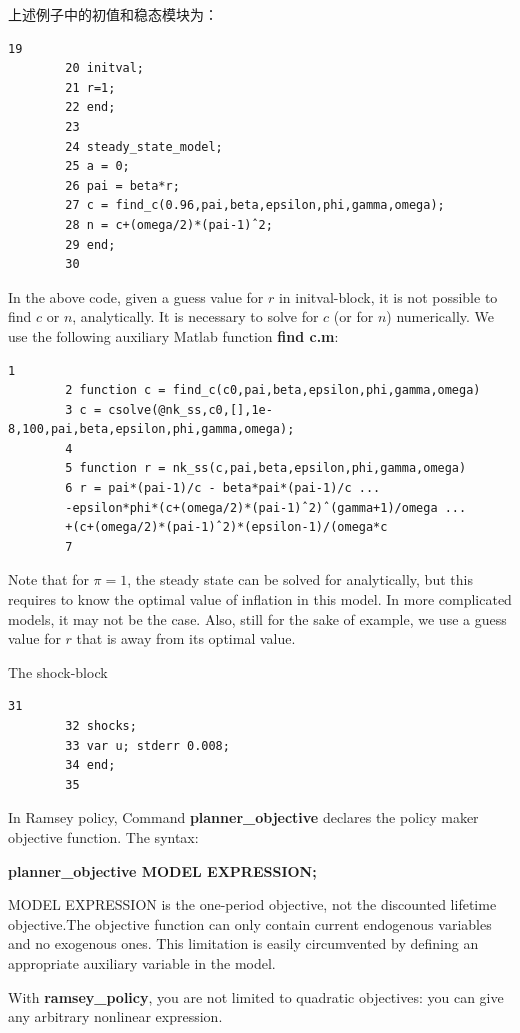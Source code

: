 \documentclass[10pt,math=newtx,citestyle=gb7714-2015,bibstyle=gb7714-2015]{elegantbook}
\begin{document}
{	上述例子中的初值和稳态模块为：
	
	\begin{lstlisting}[frame=shadowbox]
		19
		20 initval;
		21 r=1;
		22 end;
		23 
		24 steady_state_model;
		25 a = 0;
		26 pai = beta*r;
		27 c = find_c(0.96,pai,beta,epsilon,phi,gamma,omega);
		28 n = c+(omega/2)*(pai-1)ˆ2;
		29 end;
		30
	\end{lstlisting}
	
	In the above code, given a guess value for $r$ in initval-block, it is not possible to find $c$ or $n$, analytically. It is necessary to solve for $c$ (or for $n$) numerically. We use the following auxiliary Matlab function \textbf{find c.m}:
	
	\begin{lstlisting}[frame=shadowbox]
		1
		2 function c = find_c(c0,pai,beta,epsilon,phi,gamma,omega)
		3 c = csolve(@nk_ss,c0,[],1e-8,100,pai,beta,epsilon,phi,gamma,omega);
		4 
		5 function r = nk_ss(c,pai,beta,epsilon,phi,gamma,omega)
		6 r = pai*(pai-1)/c - beta*pai*(pai-1)/c ...
		-epsilon*phi*(c+(omega/2)*(pai-1)ˆ2)ˆ(gamma+1)/omega ...
		+(c+(omega/2)*(pai-1)ˆ2)*(epsilon-1)/(omega*c
		7
	\end{lstlisting}
	
	Note that for $\pi = 1$, the steady state can be solved for analytically, but this requires to know the optimal value of inflation in this model. In more complicated models, it
	may not be the case. Also, still for the sake of example, we use a guess value for $r$ that is away from its optimal value.
	
	The shock-block
	
	\begin{lstlisting}[frame=shadowbox]
		31 
		32 shocks;
		33 var u; stderr 0.008;
		34 end;
		35
	\end{lstlisting}
	
	In Ramsey policy, Command \textbf{planner\_objective} declares the policy maker objective function. The syntax:
	
	\textbf{planner\_objective MODEL EXPRESSION;}
	
	MODEL EXPRESSION is the one-period objective, not the discounted lifetime objective.The objective function can only contain current endogenous variables and no exogenous ones. This limitation is easily circumvented by defining an appropriate auxiliary variable in the model.
	
	With \textbf{ramsey\_policy}, you are not limited to quadratic objectives: you can give any arbitrary nonlinear expression.
	
}
\end{document}
